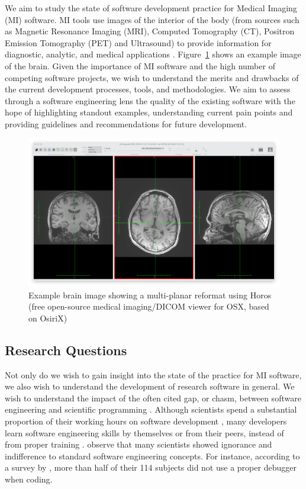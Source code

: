 \documentclass[final, 3p, times, authoryear]{elsarticle}
\begin{document}
We aim to study the state of software development practice for Medical Imaging
(MI) software.  MI tools use images of the interior of the body (from sources
such as Magnetic Resonance Imaging (MRI), Computed Tomography (CT), Positron
Emission Tomography (PET) and Ultrasound) to provide information for diagnostic,
analytic, and medical applications \citep{FDA2021, enwiki:1034887445,
Zhang2008}.  Figure~\ref{Fig_Example} shows an example image of the brain. Given
the importance of MI software and the high number of competing software
projects, we wish to understand the merits and drawbacks of the current
development processes, tools, and methodologies.  We aim to assess through a
software engineering lens the quality of the existing software with the hope of
highlighting standout examples, understanding current pain points and providing
guidelines and recommendations for future development.

\begin{figure}[!ht]
    \begin{center}
        \includegraphics[scale=0.25]{figures/MPR.png}        
    \end{center}
    \caption{Example brain image showing a multi-planar reformat using Horos (free open-source medical imaging/DICOM viewer for OSX, based on OsiriX)}
    \label{Fig_Example}
\end{figure}
    
\subsection{Research Questions} \label{sec_motivation}

Not only do we wish to gain insight into the state of the practice for MI
software, we also wish to understand the development of research software in
general. We wish to understand the impact of the often cited gap, or chasm,
between software engineering and scientific programming \citep{Kelly2007,
Storer2017}. Although scientists spend a substantial proportion of their working
hours on software development \citep{Hannay2009, Prabhu2011}, many developers
learn software engineering skills by themselves or from their peers, instead of
from proper training \citep{Hannay2009}. \citet{Hannay2009} observe that many
scientists showed ignorance and indifference to standard software engineering
concepts. For instance, according to a survey by \citet{Prabhu2011}, more than
half of their 114 subjects did not use a proper debugger when coding.
\end{document}
